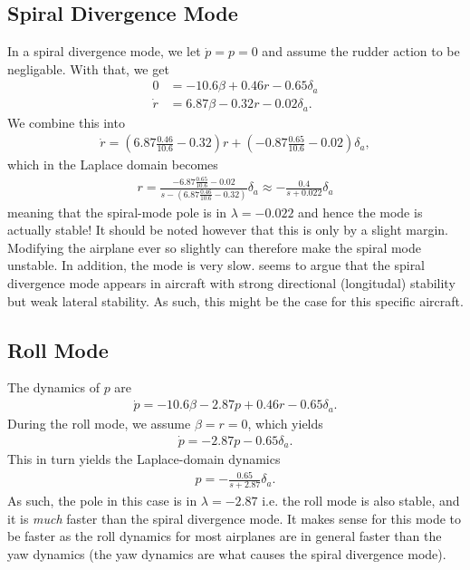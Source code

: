\subsection{Spiral Divergence Mode}
In a spiral divergence mode, we let $\dot p = p = 0$ and assume the rudder action to be negligable. With that, we get
\begin{align}
0 &= -10.6 \beta + 0.46 r - 0.65 \delta_a \\
\dot r &= 6.87 \beta - 0.32 r - 0.02 \delta_a.
\end{align}
We combine this into
\begin{equation}\begin{aligned}
\dot r = \left(6.87 \frac{0.46}{10.6} - 0.32 \right) r
+ \left( -0.87 \frac{0.65}{10.6} - 0.02 \right) \delta_a,
\end{aligned}\end{equation}
which in the Laplace domain becomes
\begin{equation}\begin{aligned}
r = \frac{-6.87 \frac{0.65}{10.6} - 0.02}{s - (6.87 \frac{0.46}{10.6} -0.32)} \delta_a
\approx -\frac{0.4}{s + 0.022} \delta_a
\end{aligned}\end{equation}
meaning that the spiral-mode pole is in $\lambda = -0.022$ and hence the mode is actually stable! It should be noted however that this is only by a slight margin. Modifying the airplane ever so slightly can therefore make the spiral mode unstable. In addition, the mode is very slow. \cite{nasa} seems to argue that the spiral divergence mode appears in aircraft with strong directional (longitudal) stability but weak lateral stability. As such, this might be the case for this specific aircraft.

\subsection{Roll Mode}
The dynamics of $p$ are
\begin{equation}\begin{aligned}
\dot p = -10.6 \beta - 2.87 p + 0.46 r - 0.65 \delta_a.
\end{aligned}\end{equation}
During the roll mode, we assume $\beta = r = 0$, which yields
\begin{equation}\begin{aligned}
\dot p = -2.87 p - 0.65 \delta_a.
\end{aligned}\end{equation}
This in turn yields the Laplace-domain dynamics
\begin{equation}\begin{aligned}
p = - \frac{0.65}{s + 2.87} \delta_a.
\end{aligned}\end{equation}
As such, the pole in this case is in $\lambda = -2.87$ i.e. the roll mode is also stable, and it is \textit{much} faster than the spiral divergence mode. It makes sense for this mode to be faster as the roll dynamics for most airplanes are in general faster than the yaw dynamics (the yaw dynamics are what causes the spiral divergence mode).
